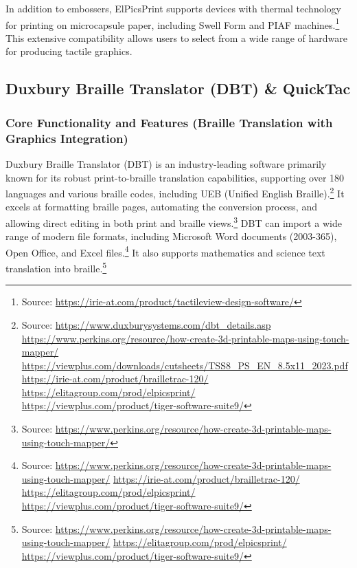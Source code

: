 In addition to embossers, ElPicsPrint supports devices with thermal technology for printing on microcapsule paper, including Swell Form and PIAF machines.\footnote{Source:  \url{https://irie-at.com/product/tactileview-design-software/}} This extensive compatibility allows users to select from a wide range of hardware for producing tactile graphics.

\subsection{Duxbury Braille Translator (DBT) \& QuickTac}

\subsubsection{Core Functionality and Features (Braille Translation with Graphics Integration)}

Duxbury Braille Translator (DBT) is an industry-leading software primarily known for its robust print-to-braille translation capabilities, supporting over 180 languages and various braille codes, including UEB (Unified English Braille).\footnote{Source:  \url{https://www.duxburysystems.com/dbt_details.asp} \url{https://www.perkins.org/resource/how-create-3d-printable-maps-using-touch-mapper/} \url{https://viewplus.com/downloads/cutsheets/TSS8_PS_EN_8.5x11_2023.pdf} \url{https://irie-at.com/product/brailletrac-120/} \url{https://elitagroup.com/prod/elpicsprint/} \url{https://viewplus.com/product/tiger-software-suite9/}} It excels at formatting braille pages, automating the conversion process, and allowing direct editing in both print and braille views.\footnote{Source:  \url{https://www.perkins.org/resource/how-create-3d-printable-maps-using-touch-mapper/}} DBT can import a wide range of modern file formats, including Microsoft Word documents (2003-365), Open Office, and Excel files.\footnote{Source:  \url{https://www.perkins.org/resource/how-create-3d-printable-maps-using-touch-mapper/} \url{https://irie-at.com/product/brailletrac-120/} \url{https://elitagroup.com/prod/elpicsprint/} \url{https://viewplus.com/product/tiger-software-suite9/}} It also supports mathematics and science text translation into braille.\footnote{Source:  \url{https://www.perkins.org/resource/how-create-3d-printable-maps-using-touch-mapper/} \url{https://elitagroup.com/prod/elpicsprint/} \url{https://viewplus.com/product/tiger-software-suite9/}}

